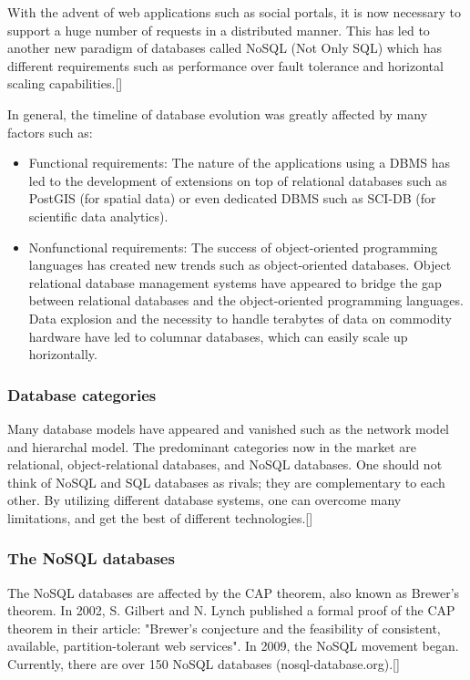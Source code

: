 With the advent of web applications such as social portals, it is now necessary to support a huge number of requests in a distributed manner. This has led to another new paradigm of databases called NoSQL (Not Only SQL) which has different requirements such as performance over fault tolerance and horizontal scaling capabilities.[\cite{14}]
\newline

In general, the timeline of database evolution was greatly affected by many factors such as:
\begin{itemize}
	\item Functional requirements: The nature of the applications using a DBMS has led to the development of extensions on top of relational databases such as PostGIS (for spatial data) or even dedicated DBMS such as SCI-DB (for scientific data analytics).
	\item Nonfunctional requirements: The success of object-oriented programming languages has created new trends such as object-oriented databases. Object relational database management systems have appeared to bridge the gap between relational databases and the object-oriented programming languages. Data explosion and the necessity to handle terabytes of data on commodity hardware have led to columnar databases, which can easily scale up horizontally.
\end{itemize}

\subsubsection*{Database categories}
Many database models have appeared and vanished such as the network model and hierarchal model. The predominant categories now in the market are relational, object-relational databases, and NoSQL databases. One should not think of NoSQL and SQL databases as rivals; they are complementary to each other. By utilizing different database systems, one can overcome many limitations, and get the best of different technologies.[\cite{14}]

\subsubsection*{The NoSQL databases}
The NoSQL databases are affected by the CAP theorem, also known as Brewer's theorem. In 2002, S. Gilbert and N. Lynch published a formal proof of the CAP theorem in their article: "Brewer's conjecture and the feasibility of consistent, available, partition-tolerant web services". In 2009, the NoSQL movement began. Currently, there are over 150 NoSQL databases (nosql-database.org).[\cite{14}]

